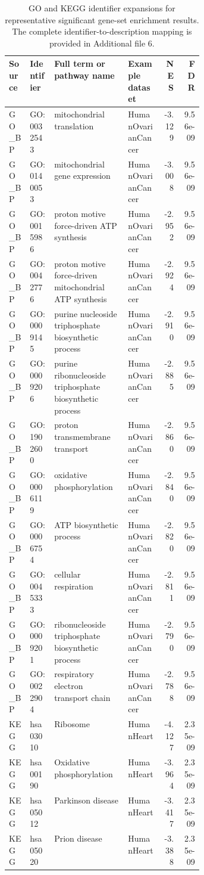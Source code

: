 \begin{table}[htbp]
\centering
\small
\caption{GO and KEGG identifier expansions for representative significant gene-set enrichment results. The complete identifier-to-description mapping is provided in Additional file 6.}
\label{tab:go-kegg-expansions}
\begin{tabular}{llp{0.38\linewidth}lrr}
\toprule
Source & Identifier & Full term or pathway name & Example dataset & NES & FDR \\
\midrule
GO\_BP & GO:0032543 & mitochondrial translation & HumanOvarianCancer & -3.129 & 9.56e-09
 \\
GO\_BP & GO:0140053 & mitochondrial gene expression & HumanOvarianCancer & -3.008 & 9.56e-09
 \\
GO\_BP & GO:0015986 & proton motive force-driven ATP synthesis & HumanOvarianCancer & -2.952 & 9.56e-09
 \\
GO\_BP & GO:0042776 & proton motive force-driven mitochondrial ATP synthesis & HumanOvarianCancer & -2.924 & 9.56e-09
 \\
GO\_BP & GO:0009145 & purine nucleoside triphosphate biosynthetic process & HumanOvarianCancer & -2.910 & 9.56e-09
 \\
GO\_BP & GO:0009206 & purine ribonucleoside triphosphate biosynthetic process & HumanOvarianCancer & -2.885 & 9.56e-09
 \\
GO\_BP & GO:1902600 & proton transmembrane transport & HumanOvarianCancer & -2.860 & 9.56e-09
 \\
GO\_BP & GO:0006119 & oxidative phosphorylation & HumanOvarianCancer & -2.840 & 9.56e-09
 \\
GO\_BP & GO:0006754 & ATP biosynthetic process & HumanOvarianCancer & -2.820 & 9.56e-09
 \\
GO\_BP & GO:0045333 & cellular respiration & HumanOvarianCancer & -2.811 & 9.56e-09
 \\
GO\_BP & GO:0009201 & ribonucleoside triphosphate biosynthetic process & HumanOvarianCancer & -2.790 & 9.56e-09
 \\
GO\_BP & GO:0022904 & respiratory electron transport chain & HumanOvarianCancer & -2.788 & 9.56e-09
 \\
KEGG & hsa03010 & Ribosome & HumanHeart & -4.127 & 2.35e-09
 \\
KEGG & hsa00190 & Oxidative phosphorylation & HumanHeart & -3.964 & 2.35e-09
 \\
KEGG & hsa05012 & Parkinson disease & HumanHeart & -3.417 & 2.35e-09
 \\
KEGG & hsa05020 & Prion disease & HumanHeart & -3.388 & 2.35e-09

\end{tabular}
\end{table}
